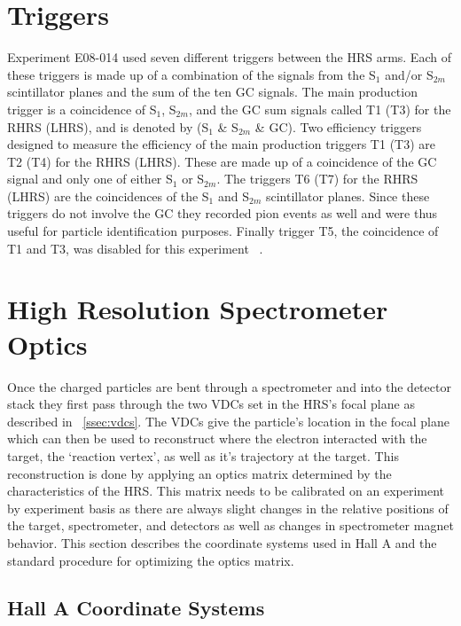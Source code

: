 \section{Triggers}
\label{sec:triggers}

Experiment E08-014 used seven different triggers between the HRS arms. Each of these triggers is made up of a combination of the signals from the S$_1$ and/or S$_{2m}$ scintillator planes and the sum of the ten GC signals. The main production trigger is a coincidence of S$_1$, S$_{2m}$, and the GC sum signals called T1 (T3) for the RHRS (LHRS), and is denoted by (S$_1$ \& S$_{2m}$ \& GC). Two efficiency triggers designed to measure the efficiency of the main production triggers T1 (T3) are T2 (T4) for the RHRS (LHRS). These are made up of a coincidence of the GC signal and only one of either S$_1$ or S$_{2m}$. The triggers T6 (T7) for the RHRS (LHRS) are the coincidences of the S$_1$ and S$_{2m}$ scintillator planes. Since these triggers do not involve the GC they recorded pion events as well and were thus useful for particle identification purposes. Finally trigger T5, the coincidence of T1 and T3, was disabled for this experiment ~\cite{Thesis:Ye}. 

\section{High Resolution Spectrometer Optics}
\label{sec:optics}

Once the charged particles are bent through a spectrometer and into the detector stack they first pass through the two VDCs set in the HRS's focal plane as described in ~\ref{ssec:vdcs}. The VDCs give the particle's location in the focal plane which can then be used to reconstruct where the electron interacted with the target, the `reaction vertex', as well as it's trajectory at the target. This reconstruction is done by applying an optics matrix determined by the characteristics of the HRS. This matrix needs to be calibrated on an experiment by experiment basis as there are always slight changes in the relative positions of the target, spectrometer, and detectors as well as changes in spectrometer magnet behavior. This section describes the coordinate systems used in Hall A and the standard procedure for optimizing the optics matrix. 

\subsection{Hall A Coordinate Systems}
\label{ssec:coordinates}

